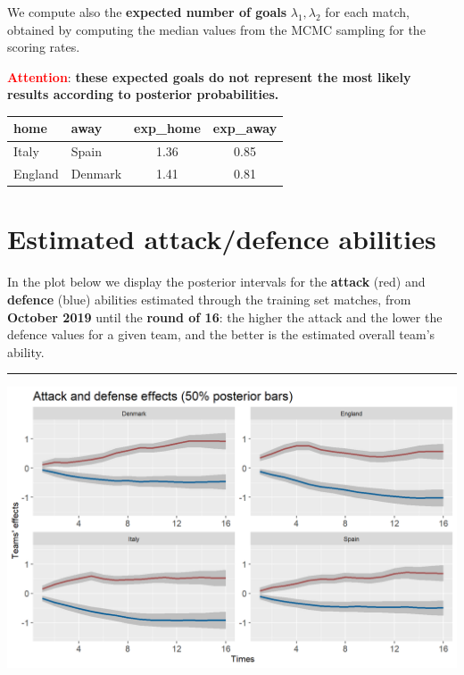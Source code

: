 \documentclass[
  10pt,
]{article}
\begin{document}
We compute also the \textbf{expected number of goals}
\(\lambda_1, \lambda_2\) for each match, obtained by computing the
median values from the MCMC sampling for the scoring rates.

\textcolor{red}{\textbf{Attention}}: \textbf{these expected goals do not represent the most likely results according to posterior probabilities.}

\begin{longtable}[]{@{}llcc@{}}
\toprule
home & away & exp\_home & exp\_away\tabularnewline
\midrule
\endhead
Italy & Spain & 1.36 & 0.85\tabularnewline
England & Denmark & 1.41 & 0.81\tabularnewline
\bottomrule
\end{longtable}

\newpage

\hypertarget{estimated-attackdefence-abilities}{%
\section{Estimated attack/defence
abilities}\label{estimated-attackdefence-abilities}}

In the plot below we display the posterior intervals for the
\textbf{attack} (red) and \textbf{defence} (blue) abilities estimated
through the training set matches, from \textbf{October 2019} until the
\textbf{round of 16}: the higher the attack and the lower the defence
values for a given team, and the better is the estimated overall team's
ability.



\begin{center}\rule{0.5\linewidth}{0.5pt}\end{center}

\begin{center}\includegraphics[width=0.9\linewidth]{figs/data-1} \end{center}
\end{document}
